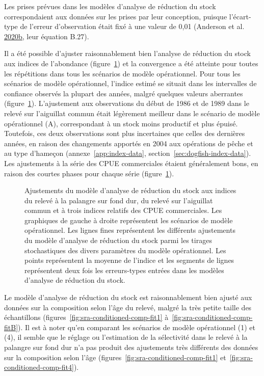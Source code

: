 \documentclass[french,11pt]{book}
\begin{document}
Les prises prévues dans les modèles d'analyse de réduction du stock correspondaient aux données sur les prises par leur conception, puisque l'écart-type de l'erreur d'observation était fixé à une valeur de 0,01 (Anderson et al. \protect\hyperlink{ref-anderson2020gfmp}{2020}\protect\hyperlink{ref-anderson2020gfmp}{b}, leur équation B.27).

Il a été possible d'ajuster raisonnablement bien l'analyse de réduction du stock aux indices de l'abondance (figure~\ref{fig:survey-fits}) et la convergence a été atteinte pour toutes les répétitions dans tous les scénarios de modèle opérationnel. Pour tous les scénarios de modèle opérationnel, l'indice estimé se situait dans les intervalles de confiance observés la plupart des années, malgré quelques valeurs aberrantes (figure~\ref{fig:survey-fits}). L'ajustement aux observations du début de 1986 et de 1989 dans le relevé sur l'aiguillat commun était légèrement meilleur dans le scénario de modèle opérationnel (A), correspondant à un stock moins productif et plus épuisé. Toutefois, ces deux observations sont plus incertaines que celles des dernières années, en raison des changements apportés en 2004 aux opérations de pêche et au type d'hameçon (annexe~\ref{app:index-data}, section~\ref{sec:dogfish-index-data}). Les ajustements à la série des CPUE commerciales étaient généralement bons, en raison des courtes phases pour chaque série (figure~\ref{fig:survey-fits}).


\begin{figure}[htb]

{\centering {} 

}

\caption{Ajustements du modèle d'analyse de réduction du stock aux indices du relevé à la palangre sur fond dur, du relevé sur l'aiguillat commun et à trois indices relatifs des CPUE commerciales. Les graphiques de gauche à droite représentent les scénarios de modèle opérationnel. Les lignes fines représentent les différents ajustements du modèle d'analyse de réduction du stock parmi les tirages stochastiques des divers paramètres du modèle opérationnel. Les points représentent la moyenne de l'indice et les segments de lignes représentent deux fois les erreurs-types entrées dans les modèles d'analyse de réduction du stock.}\label{fig:survey-fits}
\end{figure}
Le modèle d'analyse de réduction du stock est raisonnablement bien ajusté aux données sur la composition selon l'âge du relevé, malgré la très petite taille des échantillons (figures~\ref{fig:sra-conditioned-comp-fit1} à~\ref{fig:sra-conditioned-comp-fitB}). Il est à noter qu'en comparant les scénarios de modèle opérationnel (1) et (4), il semble que le réglage ou l'estimation de la sélectivité dans le relevé à la palangre sur fond dur n'a pas produit des ajustements très différents des données sur la composition selon l'âge (figures~\ref{fig:sra-conditioned-comp-fit1} et~\ref{fig:sra-conditioned-comp-fit4}).
\end{document}
